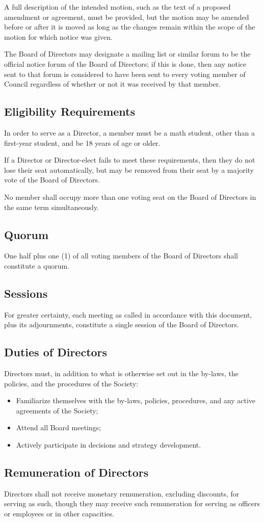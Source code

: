 A full description of the intended motion, such as the text of a
proposed amendment or agreement, must be provided, but the motion may be
amended before or after it is moved as long as the changes remain within the
scope of the motion for which notice was given.

The Board of Directors may designate a mailing list or similar forum to be the official notice
forum of the Board of Directors; if this is done, then any notice sent to that forum is
considered to have been sent to every voting member of Council regardless of
whether or not it was received by that member.

\subsection{Eligibility Requirements}
In order to serve as a Director, a member must be a math student, other than a 
first-year student, and be 18 years of age or older.

If a Director or Director-elect fails to meet these requirements, then they
do not lose their seat automatically, but may be removed from their seat by a
majority vote of the Board of Directors.

No member shall occupy more than one voting seat on the Board of Directors in the 
same term simultaneously. 

\subsection{Quorum}
One half plus one (1) of all voting members of the Board of Directors shall constitute 
a quorum.

\subsection{Sessions}
For greater certainty, each meeting as called in accordance with this document,
plus its adjournments, constitute a single session of the Board of Directors.

\subsection{Duties of Directors}
Directors must, in addition to what is otherwise set out in the by-laws, the policies, 
and the procedures of the Society:
\begin{itemize}
    \item Familiarize themselves with the by-laws, policies, 
        procedures, and any active agreements of the Society;
    \item Attend all Board meetings;
    \item Actively participate in decisions and strategy development.
\end{itemize}

\subsection{Remuneration of Directors}
Directors shall not receive monetary remuneration, excluding discounts, for serving as such,
though they may receive such remuneration for serving as officers or employees or in other 
capacities.
